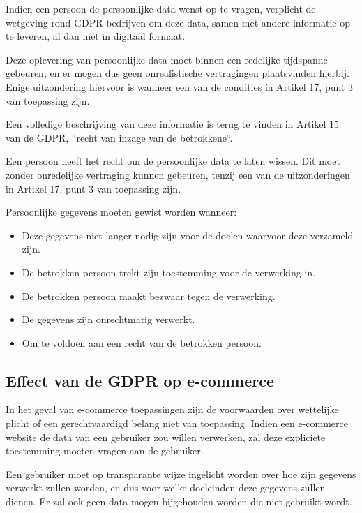 Indien een persoon de persoonlijke data wenst op te vragen, verplicht de wetgeving rond GDPR  bedrijven om deze data, samen met andere informatie op te leveren, al dan niet in digitaal formaat.

Deze oplevering van persoonlijke data moet binnen een redelijke tijdspanne gebeuren, en er mogen dus geen onrealistische vertragingen plaatsvinden hierbij. Enige uitzondering hiervoor is wanneer een van de condities in Artikel 17, punt 3 van toepassing zijn. 

 Een volledige beschrijving van deze informatie is terug te vinden in Artikel 15 van de GDPR, ``recht van inzage van de betrokkene``. \autocite{Article15GDPR2018}

Een persoon heeft het recht om de persoonlijke data te laten wissen. Dit moet zonder onredelijke vertraging kunnen gebeuren, tenzij een van de uitzonderingen in Artikel 17, punt 3 van toepassing zijn.

Persoonlijke gegevens moeten gewist worden wanneer: 

\begin{itemize}
	\item Deze gegevens niet langer nodig zijn voor de doelen waarvoor deze verzameld zijn.
	\item De betrokken persoon trekt zijn toestemming voor de verwerking in.
	\item De betrokken persoon maakt bezwaar tegen de verwerking.
	\item De gegevens zijn onrechtmatig verwerkt.
	\item Om te voldoen aan een recht van de betrokken persoon.
\end{itemize}
\autocite{Article17GDPR2018}

\subsection{Effect van de GDPR op e-commerce}
\label{subsec: Effect van de GDPR op e-commerce}

In het geval van e-commerce toepassingen zijn de voorwaarden over wettelijke plicht of een gerechtvaardigd belang niet van toepassing. Indien een e-commerce website de data van een gebruiker zou willen verwerken, zal deze expliciete toestemming moeten vragen aan de gebruiker.

Een gebruiker moet op transparante wijze ingelicht worden over hoe zijn gegevens verwerkt zullen worden, en dus voor welke doeleinden deze gegevens zullen dienen. Er zal ook geen data mogen bijgehouden worden die niet gebruikt wordt. 

